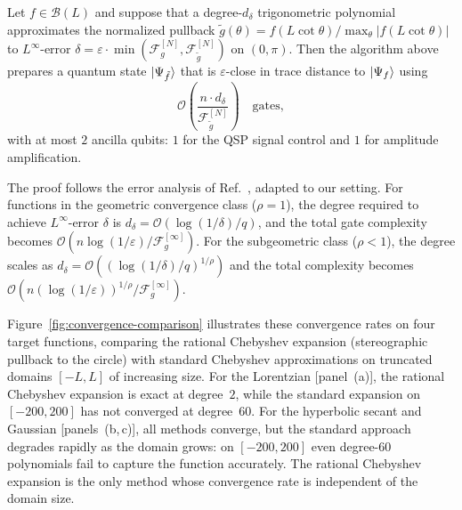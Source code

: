 \begin{theorem}
	\label{thm:state-prep}
	Let $f \in \mathcal{B}(L)$ and suppose that a degree-$d_\delta$
	trigonometric polynomial approximates the normalized pullback
	$\tilde{g}(\theta) = f(L\cot\theta)/\max_\theta|f(L\cot\theta)|$
	to $L^\infty$-error
	$\delta = \varepsilon \cdot
	\min(\mathcal{F}_g^{[N]},\mathcal{F}_{\tilde{g}}^{[N]})$
	on $(0,\pi)$.  Then the algorithm above prepares a quantum state
	$\ket{\Psi_{\tilde{f}}}$ that is $\varepsilon$-close in trace
	distance to $\ket{\Psi_f}$ using
	\begin{equation}
		\mathcal{O}\!\left(
		\frac{n \cdot d_\delta}{\mathcal{F}_{\tilde{g}}^{[N]}}
		\right) \quad \text{gates},
		\label{eq:state-prep-gates}
	\end{equation}
	with at most $2$ ancilla qubits: $1$ for the QSP
	signal control and $1$ for amplitude amplification.
\end{theorem}

The proof follows the error analysis of
Ref.~\cite{McArdleGilyenBerta2025}, adapted to our setting.
For functions in the geometric convergence class ($\rho = 1$),
the degree required to achieve $L^\infty$-error $\delta$ is
$d_\delta = \mathcal{O}(\log(1/\delta)/q)$, and the total gate
complexity becomes
$\mathcal{O}(n\log(1/\varepsilon)/\mathcal{F}_g^{[\infty]})$.
For the subgeometric class ($\rho < 1$), the degree scales as
$d_\delta = \mathcal{O}((\log(1/\delta)/q)^{1/\rho})$ and the
total complexity becomes
$\mathcal{O}(n(\log(1/\varepsilon))^{1/\rho}/
\mathcal{F}_g^{[\infty]})$.

Figure~\ref{fig:convergence-comparison} illustrates these
convergence rates on four target functions, comparing the
rational Chebyshev expansion (stereographic pullback to the
circle) with standard Chebyshev approximations on truncated
domains $[-L,L]$ of increasing size.  For the Lorentzian
[panel~(a)], the rational Chebyshev expansion is exact at
degree~$2$, while the standard expansion on $[-200,200]$ has not
converged at degree~$60$.  For the hyperbolic secant and Gaussian
[panels~(b,\,c)], all methods converge, but the standard
approach degrades rapidly as the domain grows: on $[-200,200]$
even degree-$60$ polynomials fail to capture the function
accurately.  The rational Chebyshev expansion is the only method
whose convergence rate is independent of the domain size.

